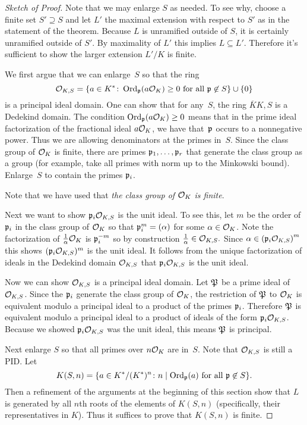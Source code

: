 \begin{proof}[Sketch of Proof]
  Note that we may enlarge $S$ as needed. To see why,
  choose a finite set $S' \supseteq S$ and let $L'$ the
  maximal extension with respect to $S'$ as in the
  statement of the theorem. Because $L$ is unramified
  outside of $S$, it is certainly unramified outside of
  $S'$. By maximality of $L'$ this implies $L \subseteq L'$.
  Therefore it's sufficient to show the larger extension
  $L'/K$ is finite.
  
  We first argue that we can enlarge~$S$ so that the ring
  \[
    \sO_{K,S} =
    \{ a \in K^* \colon \Ord_\p(a\sO_K) \geq 0 \text{ for all } \p\not\in S \}
    \cup \{0\}
  \]
  is a principal ideal domain.
  One can show that for any~$S$, the ring $\overline{K}{K,S}$ is a Dedekind domain.
  The condition $ \Ord_\p(a\sO_K) \geq 0$
  means that in the prime ideal factorization of the fractional ideal
  $a\sO_K$, we have that~$\p$ occurs to a nonnegative power. Thus we are
  allowing denominators at the primes in~$S$. Since the class group of
  $\sO_K$ is finite, there are primes $\p_1,\ldots, \p_r$ that generate
  the class group as a group (for example, take all primes with norm up to
  the Minkowski bound). Enlarge~$S$ to contain the primes $\p_i$.
  
  Note that we have used that \emph{the class group of $\sO_K$ is finite}.
  
  Next we want to show $\p_i\sO_{K,S}$ is the unit ideal. To see this,
  let $m$ be the order of $\p_i$ in the class group of $\sO_{K}$ so that
  $\p_i^m = (\alpha)$ for some $\alpha\in \sO_{K}$. Note the factorization
  of $\frac{1}{\alpha}\sO_{K}$ is $\p_i^{-m}$ so by construction
  $\frac{1}{\alpha}\in\sO_{K,S}.$ Since
  $\alpha\in \left(\p_i\sO_{K,S}\right)^m$ this shows $(\p_i\sO_{K,S})^m$
  is the unit ideal. It follows from the unique factorization of ideals
  in the Dedekind domain $\sO_{K,S}$ that $\p_i\sO_{K,S}$ is the unit ideal.
  
  Now we can show $\sO_{K,S}$ is a principal ideal domain. Let $\P$
  be a prime ideal of $\sO_{K,S}$. Since the $\p_i$ generate
  the class group of $\sO_K$, the restriction of $\P$ to $\sO_K$ is
  equivalent modulo a principal ideal to a product of the primes
  $\p_i$. Therefore $\P$ is equivalent modulo a principal ideal
  to a product of ideals of the form $\p_i\sO_{K,S}$. Because we showed
  $\p_i\sO_{K,S}$ was the unit ideal, this means $\P$ is principal.
  
  Next enlarge $S$ so that all primes over $n\sO_K$ are in~$S$.
  Note that $\sO_{K,S}$ is still a PID.  Let
  \[
    K(S,n) =
    \{ a \in K^*/(K^*)^n \colon n \mid \Ord_\p(a) \text{ for all } \p \not\in S \}.
  \]
  Then a refinement of the arguments at the beginning of
  this section show that $L$ is generated by all $n$th roots
  of the elements of $K(S,n)$ (specifically, their representatives in $K$).
  Thus it suffices to prove that $K(S,n)$ is finite.
  

\end{proof}
